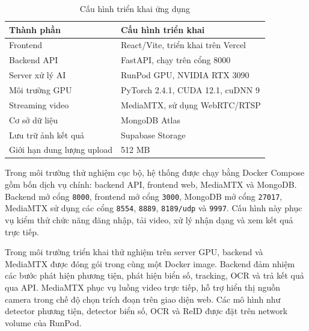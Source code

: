 \documentclass[../DoAn.tex]{subfiles}
\begin{document}
\begin{table}[htbp]
\centering
\begin{tabular}{p{4cm} p{10cm}}
\hline
\textbf{Thành phần} & \textbf{Cấu hình triển khai} \\ \hline
Frontend & React/Vite, triển khai trên Vercel \\ \hline
Backend API & FastAPI, chạy trên cổng 8000 \\ \hline
Server xử lý AI & RunPod GPU, NVIDIA RTX 3090 \\ \hline
Môi trường GPU & PyTorch 2.4.1, CUDA 12.1, cuDNN 9 \\ \hline
Streaming video & MediaMTX, sử dụng WebRTC/RTSP \\ \hline
Cơ sở dữ liệu & MongoDB Atlas \\ \hline
Lưu trữ ảnh kết quả & Supabase Storage \\ \hline
Giới hạn dung lượng upload & 512 MB \\ \hline
\end{tabular}
\caption{Cấu hình triển khai ứng dụng}
\label{table:deployment_config}
\end{table}

Trong môi trường thử nghiệm cục bộ, hệ thống được chạy bằng Docker Compose gồm bốn dịch vụ chính: backend API, frontend web, MediaMTX và MongoDB. Backend mở cổng \texttt{8000}, frontend mở cổng \texttt{3000}, MongoDB mở cổng \texttt{27017}, MediaMTX sử dụng các cổng \texttt{8554}, \texttt{8889}, \texttt{8189/udp} và \texttt{9997}. Cấu hình này phục vụ kiểm thử chức năng đăng nhập, tải video, xử lý nhận dạng và xem kết quả trực tiếp.

Trong môi trường triển khai thử nghiệm trên server GPU, backend và MediaMTX được đóng gói trong cùng một Docker image. Backend đảm nhiệm các bước phát hiện phương tiện, phát hiện biển số, tracking, OCR và trả kết quả qua API. MediaMTX phục vụ luồng video trực tiếp, hỗ trợ hiển thị nguồn camera trong chế độ chọn trích đoạn trên giao diện web. Các mô hình như detector phương tiện, detector biển số, OCR và ReID được đặt trên network volume của RunPod.
\end{document}
